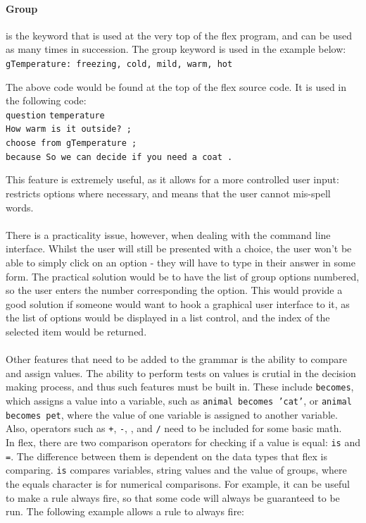 \documentclass[12pt]{report}
\begin{document}
\paragraph{Group} is the keyword that is used at the very top of the flex program, and can be used as many times in succession.  The group keyword is used in the example below:
\texttt{gTemperature: freezing, cold, mild, warm, hot}\\
\begin{tabbing}
The above code would be found at the top of the flex source code.  It is used in the following code:\\
\texttt{question} \= \texttt{temperature}\\
\> \texttt{How warm is it outside? ;}\\
\> \texttt{choose from gTemperature ;}\\
\> \texttt{because So we can decide if you need a coat .}\\
\end{tabbing}
This feature is extremely useful, as it allows for a more controlled user input: restricts options where necessary, and means that the user cannot mis-spell words.\\
\\
There is a practicality issue, however, when dealing with the command line interface.  Whilst the user will still be presented with a choice, the user won't be able to simply click on an option - they will have to type in their answer in some form.  The practical solution would be to have the list of group options numbered, so the user enters the number corresponding the option.  This would provide a good solution if someone would want to hook a graphical user interface to it, as the list of options would be displayed in a list control, and the index of the selected item would be returned.
\\
\\
Other features that need to be added to the grammar is the ability to compare and assign values.  The ability to perform tests on values is crutial in the decision making process, and thus such features must be built in.  These include \texttt{becomes}, which assigns a value into a variable, such as \texttt{animal becomes 'cat'}, or \texttt{animal becomes pet}, where the value of one variable is assigned to another variable.  Also, operators such as \texttt{+}, \texttt{-}, \texttt{\*}, and \texttt{/} need to be included for some basic math.\\
In flex, there are two comparison operators for checking if a value is equal: \texttt{is} and \texttt{=}.  The difference between them is dependent on the data types that flex is comparing.  \texttt{is} compares variables, string values and the value of groups, where the equals character is for numerical comparisons.  For example, it can be useful to make a rule always fire, so that some code will always be guaranteed to be run.  The following example allows a rule to always fire:\\
\end{document}
